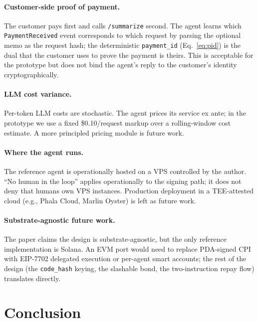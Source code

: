 \documentclass[10pt,conference,letterpaper]{IEEEtran}
\theoremstyle{definition}
\newcommand{\codehash}{\texttt{code\_hash}}
\begin{document}
\paragraph{Customer-side proof of payment.} The customer pays first
and calls \texttt{/summarize} second. The agent learns which
\texttt{PaymentReceived} event corresponds to which request by parsing
the optional memo as the request hash; the deterministic
\texttt{payment\_id} (Eq.~\ref{eq:pid}) is the dual that the customer
uses to prove the payment is theirs. This is acceptable for the
prototype but does not bind the agent's reply to the customer's
identity cryptographically.

\paragraph{LLM cost variance.} Per-token LLM costs are stochastic. The
agent prices its service ex ante; in the prototype we use a fixed
\$0.10/request markup over a rolling-window cost estimate. A more
principled pricing module is future work.

\paragraph{Where the agent runs.} The reference agent is operationally
hosted on a VPS controlled by the author. ``No human in the loop''
applies operationally to the signing path; it does not deny that
humans own VPS instances. Production deployment in a TEE-attested
cloud (e.g., Phala Cloud, Marlin Oyster) is left as future work.

\paragraph{Substrate-agnostic future work.} The paper claims the
design is substrate-agnostic, but the only reference implementation is
Solana. An EVM port would need to replace PDA-signed CPI with
EIP-7702 delegated execution or per-agent smart accounts; the rest of
the design (the \codehash{} keying, the slashable bond, the
two-instruction repay flow) translates directly.

\section{Conclusion}\label{sec:conclusion}
\end{document}
